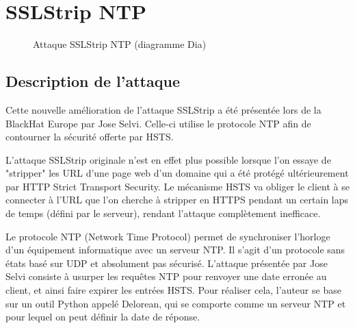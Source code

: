 \chapter{SSLStrip NTP}

\label{sec:sslstrip-ntp}

\begin{figure}[H]
  \caption{Attaque SSLStrip NTP (diagramme Dia)}
\end{figure}

\section{Description de l'attaque}

Cette nouvelle amélioration de l'attaque SSLStrip a été présentée lors de la BlackHat Europe par Jose Selvi. Celle-ci utilise le protocole NTP afin de contourner la sécurité offerte par HSTS.

L'attaque SSLStrip originale n'est en effet plus possible lorsque l'on essaye de "stripper" les URL d'une page web d'un domaine qui a été protégé ultérieurement par HTTP Strict Transport Security. Le mécanisme HSTS va obliger le client à se connecter à l'URL que l'on cherche à stripper en HTTPS pendant un certain laps de temps (défini par le serveur), rendant l'attaque complètement inefficace.

Le protocole NTP (Network Time Protocol) permet de synchroniser l'horloge d'un équipement informatique avec un serveur NTP. Il s'agit d'un protocole sans états basé sur UDP et absolument pas sécurisé. L'attaque présentée par Jose Selvi consiste à usurper les requêtes NTP pour renvoyer une date erronée au client, et ainsi faire expirer les entrées HSTS. Pour réaliser cela, l'auteur se base sur un outil Python appelé Delorean, qui se comporte comme un serveur NTP et pour lequel on peut définir la date de réponse.


